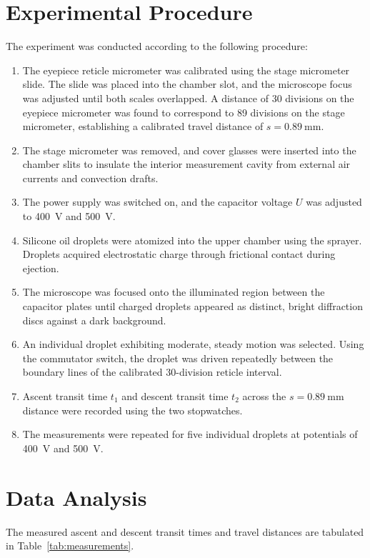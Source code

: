 \documentclass[journal]{IEEEtran}
\begin{document}
\section{Experimental Procedure}
The experiment was conducted according to the following procedure:
\begin{enumerate}
    \item The eyepiece reticle micrometer was calibrated using the stage micrometer slide. The slide was placed into the chamber slot, and the microscope focus was adjusted until both scales overlapped. A distance of 30 divisions on the eyepiece micrometer was found to correspond to 89 divisions on the stage micrometer, establishing a calibrated travel distance of $s = \SI{0.89}{\milli\meter}$.
    \item The stage micrometer was removed, and cover glasses were inserted into the chamber slits to insulate the interior measurement cavity from external air currents and convection drafts.
    \item The power supply was switched on, and the capacitor voltage $U$ was adjusted to \SI{400}{\volt} and \SI{500}{\volt}.
    \item Silicone oil droplets were atomized into the upper chamber using the sprayer. Droplets acquired electrostatic charge through frictional contact during ejection.
    \item The microscope was focused onto the illuminated region between the capacitor plates until charged droplets appeared as distinct, bright diffraction discs against a dark background.
    \item An individual droplet exhibiting moderate, steady motion was selected. Using the commutator switch, the droplet was driven repeatedly between the boundary lines of the calibrated 30-division reticle interval.
    \item Ascent transit time $t_1$ and descent transit time $t_2$ across the $s = \SI{0.89}{\milli\meter}$ distance were recorded using the two stopwatches.
    \item The measurements were repeated for five individual droplets at potentials of \SI{400}{\volt} and \SI{500}{\volt}.
\end{enumerate}

\section{Data Analysis}
The measured ascent and descent transit times and travel distances are tabulated in Table~\ref{tab:measurements}.
\end{document}
